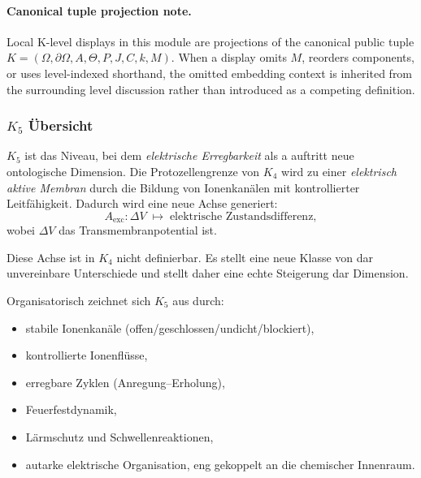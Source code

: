 



\paragraph{Canonical tuple projection note.}
Local K-level displays in this module are projections of the canonical public tuple \(K=(\Omega,\partial\Omega,A,\Theta,P,J,C,k,M)\). When a display omits \(M\), reorders components, or uses level-indexed shorthand, the omitted embedding context is inherited from the surrounding level discussion rather than introduced as a competing definition.

\subsubsection{\texorpdfstring{$K_5$}{K_5} Übersicht}
\label{sec:k5-overview}

$K_5$ ist das Niveau, bei dem \emph{elektrische Erregbarkeit} als a auftritt
neue ontologische Dimension. Die Protozellengrenze von $K_4$ wird zu einer
\emph{elektrisch aktive Membran} durch die Bildung von Ionenkanälen
mit kontrollierter Leitfähigkeit. Dadurch wird eine neue Achse generiert:
\[
A_{\mathrm{exc}}: \Delta V \;\mapsto\; \text{elektrische Zustandsdifferenz},
\]
wobei $\Delta V$ das Transmembranpotential ist.

Diese Achse ist in $K_4$ nicht definierbar. Es stellt eine neue Klasse von dar
unvereinbare Unterschiede und stellt daher eine echte Steigerung dar
Dimension.

Organisatorisch zeichnet sich $K_5$ aus durch:
\begin{itemize}
    \item stabile Ionenkanäle (offen/geschlossen/undicht/blockiert),
    \item kontrollierte Ionenflüsse,
    \item erregbare Zyklen (Anregung–Erholung),
    \item Feuerfestdynamik,
    \item Lärmschutz und Schwellenreaktionen,
    \item autarke elektrische Organisation, eng gekoppelt an die
          chemischer Innenraum.
\end{itemize}

